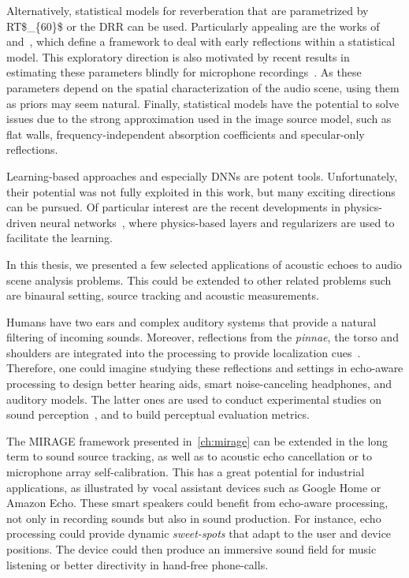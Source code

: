 \mynewline
Alternatively, statistical models for reverberation that are parametrized by \ac{RT$_{60}$} or the \acf{DRR} can be used.
Particularly appealing are the works of~ and~, which define a framework to deal with early reflections within a statistical model.
This exploratory direction is also motivated by recent results in estimating these parameters blindly for microphone recordings~.
As these parameters depend on the spatial characterization of the audio scene, using them as priors may seem natural.
Finally, statistical models have the potential to solve issues due to the strong approximation used in the image source model, such as flat walls, frequency-independent absorption coefficients and specular-only reflections.

\mynewline
Learning-based approaches and especially \acfp{DNN} are potent tools.
Unfortunately, their potential was not fully exploited in this work, but many exciting directions can be pursued.
Of particular interest are the recent developments in physics-driven neural networks~,
where physics-based layers and regularizers are used to facilitate the learning.

In this thesis, we presented a few selected applications of acoustic echoes to audio scene analysis problems.
This could be extended to other related problems such are binaural setting, source tracking and acoustic measurements.

\mynewline
Humans have two ears and complex auditory systems that provide a natural filtering of incoming sounds.
Moreover, reflections from the \textit{pinnae}, the torso and shoulders are integrated into the processing to provide localization cues~.
Therefore, one could imagine studying these reflections and settings in echo-aware processing to design better hearing aids, smart noise-canceling headphones, and auditory models.
The latter ones are used to conduct experimental studies on sound perception~, and to build perceptual evaluation metrics.

\mynewline
The \acs{MIRAGE} framework presented in~\cref{ch:mirage} can be extended in the long term to sound source tracking, as well as to acoustic echo cancellation or to microphone array self-calibration.
This has a great potential for industrial applications, as illustrated by vocal assistant devices such as Google Home or Amazon Echo.
These smart speakers could benefit from echo-aware processing, not only in recording sounds but also in sound production.
For instance, echo processing could provide dynamic \textit{sweet-spots} that adapt to the user and device positions.
The device could then produce an immersive sound field for music listening or better directivity in hand-free phone-calls.

